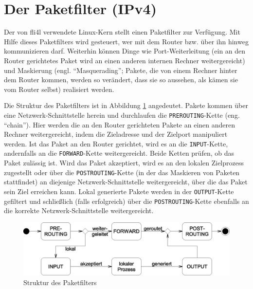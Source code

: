\section{Der Paketfilter (IPv4)}

\newcommand{\fwaction}[1]{{\small\textsf{#1}}}
\newcommand{\fwchain}[1]{\texttt{#1}}
\newcommand{\fwtable}[1]{\textsc{#1}}
\newcommand{\fwmatch}[1]{\texttt{#1}}
\newcommand{\fwpktstate}[1]{\texttt{#1}}
\newcommand{\fwloglevel}[1]{\texttt{#1}}
\newcommand{\protocol}[1]{\texttt{#1}}
\newcommand{\host}[1]{\texttt{#1}}
\newcommand{\package}[1]{\texttt{#1}}

Der von fli4l verwendete Linux-Kern stellt einen Paketfilter zur
Verfügung. Mit Hilfe dieses Paketfilters wird gesteuert, wer mit dem
Router bzw. über ihn hinweg kommunizieren darf. Weiterhin können
Dinge wie Port-Weiterleitung (ein an den Router gerichtetes Paket wird
an einen anderen internen Rechner weitergereicht) und Maskierung
(engl. ``Masquerading''; Pakete, die von einem Rechner hinter dem Router
kommen, werden so verändert, dass sie so aussehen, als kämen sie vom Router
selbst) realisiert werden.

Die Struktur des Paketfilters ist in Abbildung \ref{fig:netfilter}
angedeutet. Pakete kommen über eine Netzwerk-Schnittstelle herein und
durchlaufen die \fwchain{PREROUTING}-Kette (eng. ``chain''). Hier werden die an
den Router gerichteten Pakete an einen anderen Rechner weitergereicht, indem die
Zieladresse und der Zielport manipuliert werden. Ist das Paket
an den Router gerichtet, wird es an die \fwchain{INPUT}-Kette, andernfalls an
die \fwchain{FORWARD}-Kette weitergereicht. Beide Ketten prüfen, ob das Paket
zulässig ist. Wird das Paket akzeptiert, wird es an den lokalen
Zielprozess zugestellt oder über die \fwchain{POSTROUTING}-Kette (in der das
Maskieren von Paketen stattfindet) an diejenige Netzwerk-Schnittstelle
weitergereicht, über die das Paket sein Ziel erreichen kann. Lokal generierte
Pakete werden in der \fwchain{OUTPUT}-Kette gefiltert und schließlich (falls
erfolgreich) über die \fwchain{POSTROUTING}-Kette ebenfalls an die korrekte
Netzwerk-Schnittstelle weitergereicht.

\begin{figure}[htbp]
  \centering
  \includegraphics[width=\columnwidth]{firewall}
  \caption{Struktur des Paketfilters}
  \label{fig:netfilter}
\end{figure}

